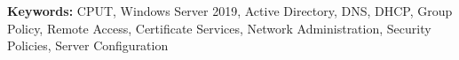 \documentclass[12pt,a4paper]{report}
\begin{document}
\vspace{0.6em}
\textsf{\bfseries\color{accent}Keywords:} CPUT, Windows Server 2019, Active Directory, DNS, DHCP, Group Policy, Remote Access, Certificate Services, Network Administration, Security Policies, Server Configuration

\clearpage
\tableofcontents
\clearpage
\listoffigures
\clearpage
\listoftables

\clearpage
{}










\end{document}
